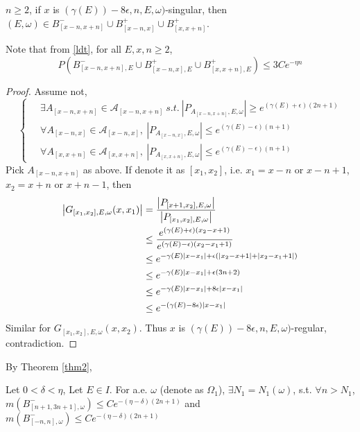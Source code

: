 \begin{lemma}\label{lemma1}
 $n \geq 2$, if $x$ is $(\gamma(E))-8\epsilon,n,E,\omega)$-singular, then $(E,\omega)\in B_{[x-n,x+n]}^-\cup B_{[x-n,x]}^+\cup B_{[x,x+n]}^+$.
\end{lemma}
\begin{remark}
  Note that from \eqref{ldt}, for all $E,x,n\geq 2$,
  \[
    P(B_{[x-n,x+n],E}^-\cup B_{[x-n,x],E}^+\cup B_{[x,x+n],E}^+)\leq 3Ce^{-\eta n}
  \]
\end{remark}
\begin{proof}
Assume not,
\[
  \left\{
  \begin{aligned}
    &~\exists A_{[x-n,x+n]}\in\mathcal{A}_{[x-n,x+n]}~s.t.~ |P_{A_{[x-n,x+n]},E,\omega}|\geq e^{(\gamma(E)+\epsilon)(2n+1)}\\
    &~\forall A_{[x-n,x]}\in\mathcal{A}_{[x-n,x]},~ |P_{A_{[x-n,x]},E,\omega}|\leq e^{(\gamma(E)-\epsilon)(n+1)}\\
    &~\forall A_{[x,x+n]}\in\mathcal{A}_{[x,x+n]},~ |P_{A_{[x,x+n]},E,\omega}|\leq e^{(\gamma(E)-\epsilon)(n+1)}
  \end{aligned}
  \right.
\]
Pick $A_{[x-n,x+n]}$ as above. If denote it as $[x_1,x_2]$, i.e. $x_1= x-n$ or $x-n+1$, $x_2=x+n$ or $x+n-1$, then
\[
  \begin{aligned}
    \left\vert G_{[x_1,x_2],E,\omega}(x,x_1)\right\vert
    &=  \frac{\left\vert P_{[x+1,x_2],E,\omega}\right\vert}{\left\vert P_{[x_1,x_2],E,\omega}\right\vert}\\
    &\leq  \frac{e^{(\gamma(E)+\epsilon)(x_2-x+1)}}{e^{(\gamma(E)-\epsilon)(x_2-x_1+1)}}\\
    &\leq  e^{-\gamma(E)\lvert x-x_1\rvert+\epsilon(\lvert x_2-x+1\rvert+\lvert x_2-x_1+1\rvert)}\\
    &\leq  e^{-\gamma(E)\lvert x-x_1\rvert+\epsilon(3n+2)}\\
    &\leq  e^{-\gamma(E)\lvert x-x_1\rvert+8\epsilon\lvert x-x_1\rvert}\\
    &\leq  e^{-(\gamma(E)-8\epsilon)\lvert x-x_1\rvert}
  \end{aligned}
\]
Similar for $G_{[x_1,x_2],E,\omega}(x,x_2)$.
Thus $x$ is $(\gamma(E))-8\epsilon, n, E,\omega)$-regular, contradiction.
\end{proof}

By Theorem \ref{thm2},

\begin{thm}\label{omega1}
  Let $0<\delta<\eta$, Let $E\in I$. For a.e. $\omega$ (denote as $\Omega_1$), $\exists N_1=N_1(\omega)$, s.t. $\forall n>N_1$, $m(B_{[n+1,3n+1],\omega}^-)\leq Ce^{-(\eta-\delta)(2n+1)}$ and $m(B_{[-n,n],\omega}^-)\leq Ce^{-(\eta-\delta)(2n+1)}$
\end{thm}

